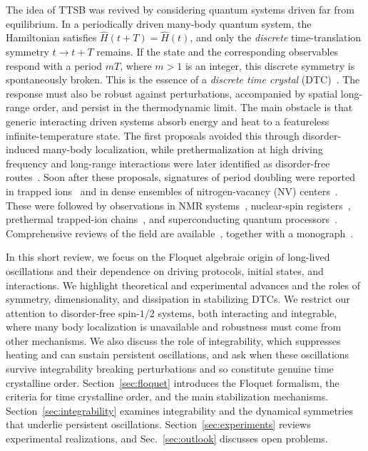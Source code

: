 \documentclass[%
reprint,
superscriptaddress,
amsmath,amssymb,
aps,
prb,
showkeys,%
floatfix,
]{revtex4-2}
\let\cite\citep   %
\begin{document}
	The idea of TTSB was revived by considering quantum systems driven far from equilibrium. In a periodically driven many-body quantum system, the Hamiltonian satisfies $\hat{H}(t+T)=\hat{H}(t)$, and only the \emph{discrete} time-translation symmetry $t\to t+T$ remains. If the state and the corresponding observables respond with a period $mT$, where $m>1$ is an integer, this discrete symmetry is spontaneously broken. This is the essence of a \emph{discrete time crystal} (DTC)~\cite{Sacha2015,KhemaniPRL2016,ElseBauerNayak2016,vonKeyserlingk2016,YaoPRL2017}. The response must also be robust against perturbations, accompanied by spatial long-range order, and persist in the thermodynamic limit. The main obstacle is that generic interacting driven systems absorb energy and heat to a featureless infinite-temperature state. The first proposals avoided this through disorder-induced many-body localization, while prethermalization at high driving frequency and long-range interactions were later identified as disorder-free routes~\cite{ElseBauerNayakPRX2017,Russomanno2017,Pizzi2021}. Soon after these proposals, signatures of period doubling were reported in trapped ions~\cite{Zhang2017} and in dense ensembles of nitrogen-vacancy (NV) centers~\cite{Choi2017}. These were followed by observations in NMR systems~\cite{Pal2018,Rovny2018}, nuclear-spin registers~\cite{Randall2021}, prethermal trapped-ion chains~\cite{Kyprianidis2021}, and superconducting quantum processors~\cite{Mi2022}. Comprehensive reviews of the field are available~\cite{SachaReview2018,KhemaniHistory2019,ElseAnnRev2020,ZaletelRMP2023}, together with a monograph~\cite{SachaBook2020}.
	
	In this short review, we focus on the Floquet algebraic origin of long-lived oscillations and their dependence on driving protocols, initial states, and interactions. We highlight theoretical and experimental advances and the roles of symmetry, dimensionality, and dissipation in stabilizing DTCs. We restrict our attention to disorder-free spin-$1/2$ systems, both interacting and integrable, where many body localization is unavailable and robustness must come from other mechanisms. We also discuss the role of integrability, which suppresses heating and can sustain persistent oscillations, and ask when these oscillations survive integrability breaking perturbations and so constitute genuine time crystalline order. Section~\ref{sec:floquet} introduces the Floquet formalism, the criteria for time crystalline order, and the main stabilization mechanisms. Section~\ref{sec:integrability} examines integrability and the dynamical symmetries that underlie persistent oscillations. Section~\ref{sec:experiments} reviews experimental realizations, and Sec.~\ref{sec:outlook} discusses open problems.
	
\end{document}
